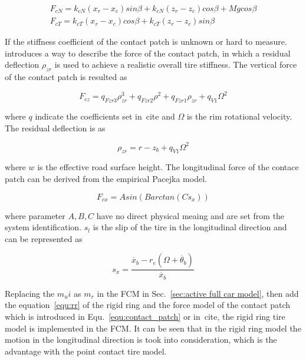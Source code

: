\begin{align}
\label{equ:contact_patch}
F_{cN} = k_{cN}(x_r-x_c)sin\beta+k_{cN}(z_r-z_c)cos\beta+Mg cos\beta \\
F_{cT} = k_{cT}(x_r-x_c)cos\beta+k_{cT}(z_r-z_c)sin\beta
\end{align}

If the stiffness coefficient of the contact patch is unknown or hard to measure.
%
\cite{zegelaar1998dynamic} introduces a way to describe the force of the contact patch, in which a residual deflection $\rho_{zr}$ is used to achieve a realistic overall tire stiffness.
%
The vertical force of the contact patch is resulted as

\begin{equation}
F_{cz} = q_{Fzr3}\rho_{zr}^3+q_{Fzr2}\rho^2+q_{Fzr1}\rho_{zr}+q_{V1}\Omega^2
\end{equation}

where $q$ indicate the coefficients set in~cite{} and $\Omega$ is the rim rotational velocity.
%
The residual deflection is as

\begin{equation}
\rho_{zr}=r-z_b+q_{V1}\Omega^2
\end{equation}

where $w$ is the effective road surface height.
%
The longitudinal force of the contace patch can be derived from the empirical Pacejka model.

\begin{equation}
F_{cx} = Asin(Barctan(Cs_x))
\end{equation}

where parameter $A,B,C$ have no direct physical meaing and are set from the system identification.
%
$s_l$ is the slip of the tire in the longitudinal direction and can be represented as

\begin{equation}
s_x=\frac{\dot{x_b}-r_e(\Omega+\dot{\theta_b})}{\dot{x_b}}
\end{equation}

Replacing the $m_ui$ as $m_r$ in the \ac{FCM} in Sec.~\ref{sec:active full car model}, then add the equation~\ref{equ:rr} of the rigid ring and the force model of the contact patch which is introduced in Equ.~\ref{equ:contact_patch} or in~cite{}, the rigid ring tire model is implemented in the \ac{FCM}.
%
It can be seen that in the rigid ring model the motion in the longitudinal direction is took into consideration, which is the advantage with the point contact tire model.
 
